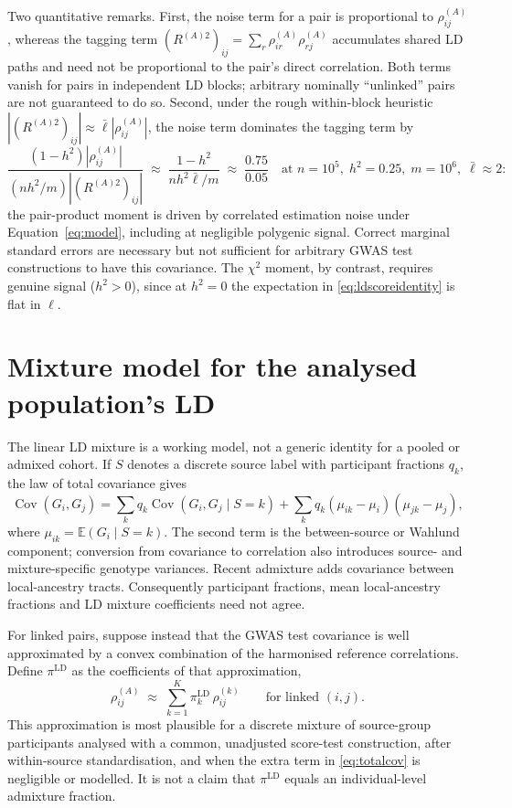 \documentclass[11pt,a4paper]{article}
\newcommand{\Rho}{\rho}
\begin{document}
Two quantitative remarks. First, the noise term for a pair is proportional
to $\Rho^{(A)}_{ij}$, whereas the tagging term
$(R^{(A)2})_{ij}=\sum_r\Rho^{(A)}_{ir}\Rho^{(A)}_{rj}$ accumulates shared LD
paths and need not be proportional to the pair's direct correlation. Both
terms vanish for pairs in independent LD blocks; arbitrary nominally
``unlinked'' pairs are not guaranteed to do so. Second, under the rough
within-block heuristic
$|(R^{(A)2})_{ij}|\approx\bar\ell|\Rho^{(A)}_{ij}|$, the noise term
dominates the tagging term by
\begin{equation}\label{eq:sigratio}
  \frac{(1-h^2)|\Rho^{(A)}_{ij}|}
       {(nh^2/m)|(R^{(A)2})_{ij}|}
  \;\approx\;
  \frac{1 - h^2}{n h^2 \bar\ell / m}
  \;\approx\; \frac{0.75}{0.05}
  \quad \text{at } n = 10^5,\; h^2 = 0.25,\; m = 10^6,\; \bar\ell \approx 2:
\end{equation}
the pair-product moment is driven by correlated estimation noise under
Equation~\eqref{eq:model}, including at negligible polygenic signal. Correct
marginal standard errors are necessary but not sufficient for arbitrary GWAS
test constructions to have this covariance. The $\chi^2$ moment, by contrast,
requires genuine signal ($h^2 > 0$), since at $h^2 = 0$ the expectation in
\eqref{eq:ldscoreidentity} is flat in $\ell$.

\section{Mixture model for the analysed population's LD}\label{sec:mixture}

The linear LD mixture is a working model, not a generic identity for a pooled
or admixed cohort. If $S$ denotes a discrete source label with participant
fractions $q_k$, the law of total covariance gives
\begin{equation}\label{eq:totalcov}
  \operatorname{Cov}(G_i,G_j)
  = \sum_k q_k\operatorname{Cov}(G_i,G_j\mid S=k)
  + \sum_k q_k(\mu_{ik}-\mu_i)(\mu_{jk}-\mu_j),
\end{equation}
where $\mu_{ik}=\mathbb{E}(G_i\mid S=k)$. The second term is the
between-source or Wahlund component; conversion from covariance to
correlation also introduces source- and mixture-specific genotype
variances. Recent admixture adds covariance between local-ancestry tracts.
Consequently participant fractions, mean local-ancestry fractions and LD
mixture coefficients need not agree.

For linked pairs, suppose instead that the GWAS test covariance is well
approximated by a convex combination of the harmonised reference
correlations. Define $\pi^{\mathrm{LD}}$ as the coefficients of that
approximation,
\begin{equation}\label{eq:ldmix}
  \Rho^{(A)}_{ij} \;\approx\;
  \sum_{k=1}^{K} \pi^{\mathrm{LD}}_k\, \Rho^{(k)}_{ij}
  \qquad\text{for linked } (i,j).
\end{equation}
This approximation is most plausible for a discrete mixture of source-group
participants analysed with a common, unadjusted score-test construction,
after within-source standardisation, and when the extra term in
\eqref{eq:totalcov} is negligible or modelled. It is not a claim that
$\pi^{\mathrm{LD}}$ equals an individual-level admixture fraction.
\end{document}
